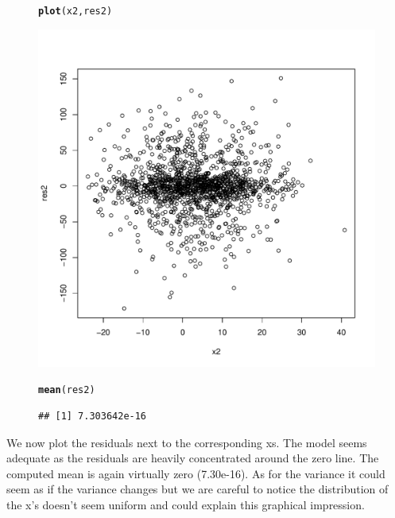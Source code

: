 \documentclass{article}\usepackage[]{graphicx}\usepackage[]{color}
\makeatletter
\def\maxwidth{ %
  \ifdim\Gin@nat@width>\linewidth
    \linewidth
  \else
    \Gin@nat@width
  \fi
}
\newcommand{\hlstd}[1]{\textcolor[rgb]{0.345,0.345,0.345}{#1}}%
\newcommand{\hlkwd}[1]{\textcolor[rgb]{0.737,0.353,0.396}{\textbf{#1}}}%
\newenvironment{kframe}{%
 \def\at@end@of@kframe{}%
 \ifinner\ifhmode%
  \def\at@end@of@kframe{\end{minipage}}%
  \begin{minipage}{\columnwidth}%
 \fi\fi%
 \def\FrameCommand##1{\hskip\@totalleftmargin \hskip-\fboxsep
 \colorbox{shadecolor}{##1}\hskip-\fboxsep
     \hskip-\linewidth \hskip-\@totalleftmargin \hskip\columnwidth}%
 \MakeFramed {\advance\hsize-\width
   \@totalleftmargin\z@ \linewidth\hsize
   \@setminipage}}%
 {\par\unskip\endMakeFramed%
 \at@end@of@kframe}
\newenvironment{knitrout}{}{} %
\makeatother
\begin{document}
\begin{figure}[htbp]
\begin{knitrout}
\color{fgcolor}\begin{kframe}
\begin{alltt}
\hlkwd{plot}\hlstd{(x2,res2)}
\end{alltt}
\end{kframe}
\includegraphics[width=\maxwidth]{figure/unnamed-chunk-5-1} 
\begin{kframe}\begin{alltt}
\hlkwd{mean}\hlstd{(res2)}
\end{alltt}
\begin{verbatim}
## [1] 7.303642e-16
\end{verbatim}
\end{kframe}
\end{knitrout}
\end{figure}
We now plot the residuals next to the corresponding xs. The model seems adequate as the residuals are heavily concentrated around the zero line. The computed mean is again virtually zero (7.30e-16). As for the variance it could seem as if the variance changes but we are careful to notice the distribution of the x's doesn't seem uniform and could explain this graphical impression. 
\end{document}
